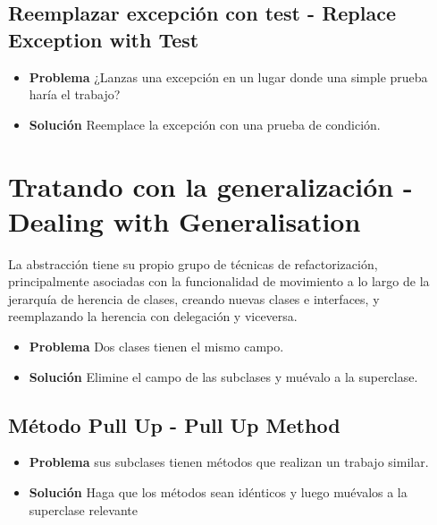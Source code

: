 \documentclass[11pt,a4paper,oneside]{book}
\begin{document}


\subsection{Reemplazar excepción con test - Replace Exception with Test}
\label{reemplazarexcepcioncontest}
\begin{itemize}
    \item \textbf{Problema} ¿Lanzas una excepción en un lugar donde una simple prueba haría el trabajo?
    \item \textbf{Solución} Reemplace la excepción con una prueba de condición.
\end{itemize}
    



\section{Tratando con la generalización - Dealing with Generalisation}
La abstracción tiene su propio grupo de técnicas de refactorización, principalmente asociadas con la funcionalidad de movimiento a lo largo de la jerarquía de herencia de clases, creando nuevas clases e interfaces, y reemplazando la herencia con delegación y viceversa.

\label{renombrarmetodo}
\begin{itemize}
    \item \textbf{Problema} Dos clases tienen el mismo campo.
    \item \textbf{Solución} Elimine el campo de las subclases y muévalo a la superclase.
\end{itemize}

\subsection{Método Pull Up - Pull Up Method}
\label{renombrarmetodo}
\begin{itemize}
    \item \textbf{Problema} sus subclases tienen métodos que realizan un trabajo similar.
    \item \textbf{Solución} Haga que los métodos sean idénticos y luego muévalos a la superclase relevante
\end{itemize}
\end{document}
